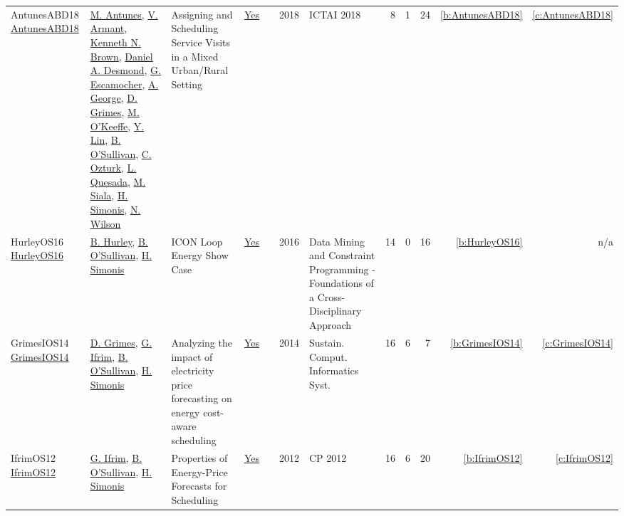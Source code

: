 {\begin{longtable}{>{\raggedright\arraybackslash}p{3cm}>{\raggedright\arraybackslash}p{6cm}>{\raggedright\arraybackslash}p{6.5cm}rrrp{2.5cm}rrrrr}
AntunesABD18 \href{https://doi.org/10.1109/ICTAI.2018.00027}{AntunesABD18} & \hyperref[auth:a891]{M. Antunes}, \hyperref[auth:a892]{V. Armant}, \hyperref[auth:a223]{Kenneth N. Brown}, \hyperref[auth:a893]{Daniel A. Desmond}, \hyperref[auth:a894]{G. Escamocher}, \hyperref[auth:a895]{A. George}, \hyperref[auth:a183]{D. Grimes}, \hyperref[auth:a896]{M. O'Keeffe}, \hyperref[auth:a897]{Y. Lin}, \hyperref[auth:a16]{B. O'Sullivan}, \hyperref[auth:a898]{C. Ozturk}, \hyperref[auth:a899]{L. Quesada}, \hyperref[auth:a130]{M. Siala}, \hyperref[auth:a17]{H. Simonis}, \hyperref[auth:a838]{N. Wilson} & Assigning and Scheduling Service Visits in a Mixed Urban/Rural Setting & \href{../works/AntunesABD18.pdf}{Yes} & \cite{AntunesABD18} & 2018 & ICTAI 2018 & 8 & 1 & 24 & \ref{b:AntunesABD18} & \ref{c:AntunesABD18}\\
HurleyOS16 \href{https://doi.org/10.1007/978-3-319-50137-6\_15}{HurleyOS16} & \hyperref[auth:a900]{B. Hurley}, \hyperref[auth:a16]{B. O'Sullivan}, \hyperref[auth:a17]{H. Simonis} & {ICON} Loop Energy Show Case & \href{../works/HurleyOS16.pdf}{Yes} & \cite{HurleyOS16} & 2016 & Data Mining and Constraint Programming - Foundations of a Cross-Disciplinary Approach & 14 & 0 & 16 & \ref{b:HurleyOS16} & n/a\\
GrimesIOS14 \href{https://doi.org/10.1016/j.suscom.2014.08.009}{GrimesIOS14} & \hyperref[auth:a183]{D. Grimes}, \hyperref[auth:a184]{G. Ifrim}, \hyperref[auth:a16]{B. O'Sullivan}, \hyperref[auth:a17]{H. Simonis} & Analyzing the impact of electricity price forecasting on energy cost-aware scheduling & \href{../works/GrimesIOS14.pdf}{Yes} & \cite{GrimesIOS14} & 2014 & Sustain. Comput. Informatics Syst. & 16 & 6 & 7 & \ref{b:GrimesIOS14} & \ref{c:GrimesIOS14}\\
IfrimOS12 \href{https://doi.org/10.1007/978-3-642-33558-7\_68}{IfrimOS12} & \hyperref[auth:a184]{G. Ifrim}, \hyperref[auth:a16]{B. O'Sullivan}, \hyperref[auth:a17]{H. Simonis} & Properties of Energy-Price Forecasts for Scheduling & \href{../works/IfrimOS12.pdf}{Yes} & \cite{IfrimOS12} & 2012 & CP 2012 & 16 & 6 & 20 & \ref{b:IfrimOS12} & \ref{c:IfrimOS12}\\
\end{longtable}
}

\clearpage
